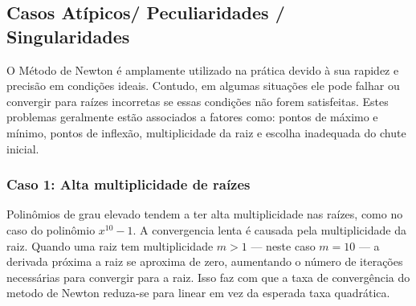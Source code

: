 \subsection{Casos Atípicos/ Peculiaridades / Singularidades }
O Método de Newton é amplamente utilizado na prática devido à sua rapidez e precisão em condições ideais. Contudo, em algumas situações ele pode falhar ou convergir para raízes incorretas se essas condições não forem satisfeitas. Estes problemas geralmente estão associados a fatores como: pontos de máximo e mínimo, pontos de inflexão, multiplicidade da raiz e escolha inadequada do chute inicial.

\subsubsection{Caso 1: Alta multiplicidade de raízes}
Polinômios de grau elevado tendem a ter alta multiplicidade nas raízes, como no caso do polinômio $x^{10} - 1$.
A convergencia lenta é causada pela multiplicidade da raiz. Quando uma raiz tem multiplicidade $m > 1$ — neste caso $m = 10$ — a derivada próxima a raiz se aproxima de zero, aumentando o número de iterações necessárias para convergir para a raiz.
Isso faz com que a taxa de convergência do metodo de Newton reduza-se para linear em vez da esperada taxa quadrática.
